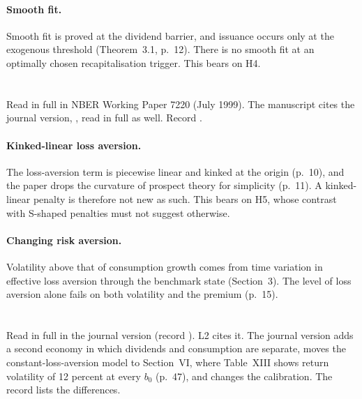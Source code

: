 \documentclass[11pt]{article}
\begin{document}
\paragraph{Smooth fit.} Smooth fit is proved at the dividend barrier, and
issuance occurs only at the exogenous threshold (Theorem~3.1, p.~12). There
is no smooth fit at an optimally chosen recapitalisation trigger. This bears
on H4.

\section{\citet{barberis1999}}

Read in full in NBER Working Paper 7220 (July 1999). The manuscript cites
the journal version, \citet{barberis2001}, read in full as well. Record
.

\paragraph{Kinked-linear loss aversion.} The loss-aversion term is piecewise
linear and kinked at the origin (p.~10), and the paper drops the curvature of
prospect theory for simplicity (p.~11). A kinked-linear penalty is therefore
not new as such. This bears on H5, whose contrast with S-shaped penalties
must not suggest otherwise.

\paragraph{Changing risk aversion.} Volatility above that of consumption
growth comes from time variation in effective loss aversion through the
benchmark state (Section~3). The level of loss aversion alone fails on both
volatility and the premium (p.~15).

\section{\citet{barberis2001}}

Read in full in the journal version (record
). L2 cites it. The journal version adds a second economy in which dividends and
consumption are separate, moves the constant-loss-aversion model to
Section~VI, where Table~XIII shows return volatility of 12 percent at every
$b_0$ (p.~47), and changes the calibration. The record lists the differences.

\section{\citet{li2023}}
\end{document}
